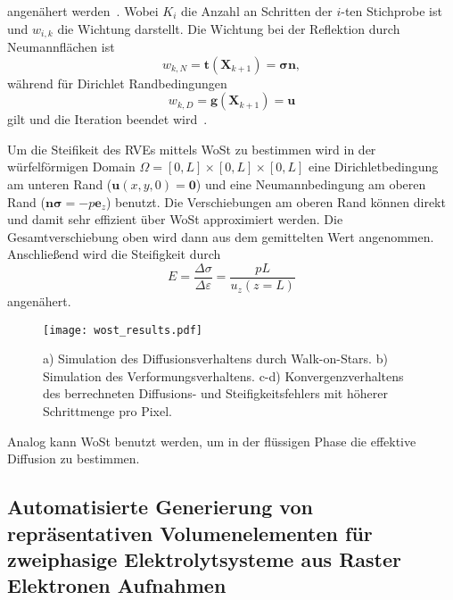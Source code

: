 angenähert werden~\cite{Kulkarni2003,Taylor2013,Chen2024b}. Wobei $K_i$ die Anzahl an Schritten der $i$-ten Stichprobe ist und $w_{i,k}$ die Wichtung darstellt. Die Wichtung bei der Reflektion durch Neumannflächen ist 
\begin{equation}
    w_{k,N} = \boldsymbol{t}(\boldsymbol{X}_{k+1}) = \boldsymbol{\sigma} \boldsymbol{n},
\end{equation}
während für Dirichlet Randbedingungen
\begin{equation}
    w_{k,D} = \boldsymbol{g}(\boldsymbol{X}_{k+1}) = \boldsymbol{u}
\end{equation} 
gilt und die Iteration beendet wird~\cite{Shia2000,Lazar2014,Sawhney2023a}.

Um die Steifikeit des RVEs mittels WoSt zu bestimmen wird in der würfelförmigen Domain $\Omega = [0,L] \times [0,L] \times [0,L]$ eine Dirichletbedingung am unteren Rand ($\boldsymbol{u}(x,y,0) = \boldsymbol{0}$) und eine Neumannbedingung am oberen Rand ($\boldsymbol{n} \boldsymbol{\sigma} = -p \boldsymbol{e}_z$) benutzt. Die Verschiebungen am oberen Rand können direkt und damit sehr effizient über WoSt approximiert werden. Die Gesamtverschiebung oben wird dann aus dem gemittelten Wert angenommen. Anschließend wird die Steifigkeit durch 
\begin{equation}
E = \frac{\Delta \sigma}{\Delta \varepsilon} = \frac{pL}{u_z(z=L)}  
\end{equation}
angenähert.

\begin{figure}[!h]
        \center
		\texttt{[image: wost\_results.pdf]}
		\caption{\label{fig:wost_result}a) Simulation des Diffusionsverhaltens durch Walk-on-Stars. b) Simulation des Verformungsverhaltens. c-d) Konvergenzverhaltens des berrechneten Diffusions- und Steifigkeitsfehlers mit höherer Schrittmenge pro Pixel.
        }
\end{figure}

Analog kann WoSt benutzt werden, um in der flüssigen Phase die effektive Diffusion zu bestimmen.



\subsection{Automatisierte Generierung von repräsentativen Volumenelementen für zweiphasige Elektrolytsysteme aus Raster Elektronen Aufnahmen}

